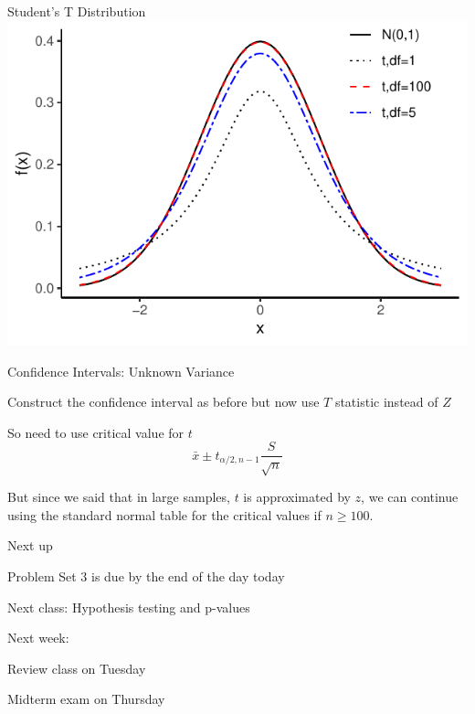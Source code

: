 \documentclass{./../div_teaching_slides}
\begin{document}
\begin{frame}{Student's T Distribution}
\centering
	\includegraphics{./../../Output/tdist.pdf} 
\end{frame}

\begin{frame}{Confidence Intervals: Unknown Variance}
\begin{witemize}
  \item Construct the confidence interval as before but now use $T$ statistic instead of $Z$
  \item So need to use critical value for $t$
  $$ \bar{x} \pm  t_{\alpha/2,n-1}  \frac{S}{\sqrt{n}}$$
 \item But since we said that in large samples, $t$ is approximated by $z$, we can continue using the standard normal table for the critical values if $n \geq 100$. 
\end{witemize}
\end{frame}


\begin{frame}{Next up}
\vspace{-0.5em}
\begin{witemize}
  \item Problem Set 3 is due by the end of the day today 
  \item Next class: Hypothesis testing and p-values
  \item Next week: \\
  \begin{witemize}
  \normalsize
  \item Review class on Tuesday 
  \item Midterm exam on Thursday 
\end{witemize}
\end{witemize}
\end{frame}
\end{document}
